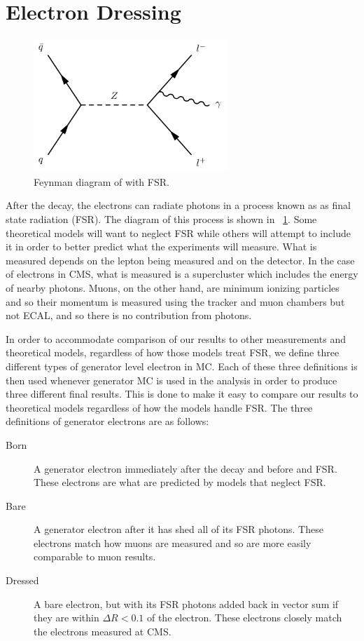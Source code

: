 \section{Electron Dressing}
\label{sec:electron_dressing}

\begin{figure}[!htbp]
    \centering
    \includegraphics[width=0.65\textwidth]{figures/fsr.pdf}
    \caption{
        Feynman diagram of \Ztoll with FSR.
    }
    \label{fig:fsr_diagram}
\end{figure}

After the \Ztoee decay, the electrons can radiate photons in a process known as
as final state radiation (FSR). The diagram of this process is shown in
\FIG~\ref{fig:fsr_diagram}. Some theoretical models will want to neglect FSR
while others will attempt to include it in order to better predict what the
experiments will measure. What is measured depends on the lepton being measured
and on the detector. In the case of electrons in CMS, what is measured is a
supercluster which includes the energy of nearby photons. Muons, on the other
hand, are minimum ionizing particles and so their momentum is measured using
the tracker and muon chambers but not ECAL, and so there is no contribution
from photons.

In order to accommodate comparison of our results to other measurements and
theoretical models, regardless of how those models treat FSR, we define three
different types of generator level electron in MC. Each of these three
definitions is then used whenever generator MC is used in the analysis in order
to produce three different final results. This is done to make it easy to
compare our results to theoretical models regardless of how the models handle
FSR. The three definitions of generator electrons are as follows:

\begin{description}
    \item[Born] A generator electron immediately after the \Ztoee decay and
        before and FSR. These electrons are what are predicted by models that
        neglect FSR.
    \item[Bare] A generator electron after it has shed all of its FSR photons.
        These electrons match how muons are measured and so are more easily
        comparable to muon results.
    \item[Dressed] A bare electron, but with its FSR photons added back in
        vector sum if they are within $\Delta R < 0.1$ of the electron. These
        electrons closely match the electrons measured at CMS.
\end{description}
